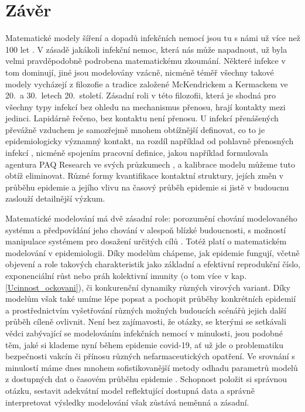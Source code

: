 \section*{Závěr}

Matematické modely šíření a dopadů infekčních nemocí jsou tu s námi už více než 100 let \cite{AndersonMay1991,KeelingRohani2008,VynnyckyWhite2010}. V zásadě jakákoli infekční nemoc, která nás může napadnout, už byla velmi pravděpodobně podrobena matematickému zkoumání. Některé infekce v tom dominují, jiné jsou modelovány vzácně, nicméně téměř všechny takové modely vycházejí z filozofie a tradice založené McKendrickem a Kermackem ve 20.\ a 30.\ letech 20.\ století. Zásadní roli v této filozofii, která je shodná pro všechny typy infekcí bez ohledu na mechanismus přenosu, hrají kontakty mezi jedinci. Lapidárně řečeno, bez kontaktu není přenosu. U infekcí přenášených převážně vzduchem je samozřejmě mnohem obtížnější definovat, co to je epidemiologicky významný kontakt, na rozdíl například od pohlavně přenosných infekcí \cite{Rao_etal2021}, nicméně spojením pracovní definice, jakou například formulovala agentura PAQ Research ve svých průzkumech \cite[\url{www.zivotbehempandemie.cz}]{paqcovid}, a kalibrace modelu můžeme tuto obtíž eliminovat. Různé formy kvantifikace kontaktní struktury, jejích změn v průběhu epidemie a jejího vlivu na časový průběh epidemie si jistě v budoucnu zaslouží detailnější výzkum.

Matematické modelování má dvě zásadní role: porozumění chování modelovaného systému a předpovídání jeho chování v alespoň blízké budoucnosti, s možností manipulace systémem pro dosažení určitých cílů \cite{GerleeLundh2016}. Totéž platí o matematickém modelování v epidemiologii. Díky modelům chápeme, jak epidemie fungují, včetně objevení a role takových charakteristik jako základní a efektivní reprodukční číslo, exponenciální růst nebo práh kolektivní imunity (o tom více v kap.\,\ref{Ucinnost_ockovani}), či konkurenční dynamiky různých virových variant. Díky modelům však také umíme lépe popsat a pochopit průběhy konkrétních epidemií a prostřednictvím vyšetřování různých možných budoucích scénářů jejich další průběh cíleně ovlivnit. Není bez zajímavosti, že otázky, se kterými se setkávali vědci zabývající se modelováním infekčních nemocí v minulosti, jsou podobné těm, jaké si klademe nyní během epidemie covid-19, ať už jde o problematiku bezpečnosti vakcín či přínosu různých nefarmaceutických opatření. Ve srovnání s minulostí máme dnes mnohem sofistikovanější metody odhadu parametrů modelů z dostupných dat o časovém průběhu epidemie \cite{King_etal2016}. Schopnost položit si správnou otázku, sestavit adekvátní model reflektující dostupná data a správně interpretovat výsledky modelování však zůstává neměnná a zásadní.  

